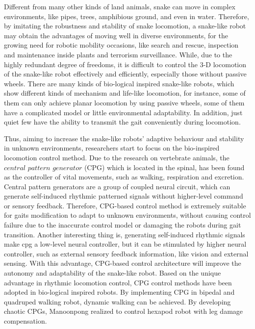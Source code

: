 \documentclass[letterpaper, 10 pt, conference]{ieeeconf}
\begin{document}
Different from many other kinds of land animals, snake can move in complex environments, like pipes, trees, amphibious ground, and even in water\cite{ma2010cpg}. Therefore, by imitating the robustness and stability of snake locomotion, a snake-like robot may obtain the advantages of moving well in diverse environments, for the growing need for robotic mobility occasions, like search and rescue, inspection and maintenance inside plants and terrorism surveillance.
While, due to the highly redundant degree of freedoms, it is difficult to control the 3-D locomotion of the snake-like robot effectively and efficiently, especially those without passive wheels\cite{tanaka2015control}.
There are many kinds of bio-logical inspired snake-like robots\cite{hirosebiologically}\cite{ACMR3}\cite{ACMR5}\cite{cmusnake2013}, which show different kinds of mechanism and life-like locomotion, for instance, some of them can only achieve planar locomotion by using passive wheels\cite{shugen2001analysis}, some of them have a complicated model\cite{saito2002modeling} or little environmental adaptability. In addition, just quiet few have the ability to transmit the gait conveniently during locomotion.

Thus, aiming to increase the snake-like robots' adaptive behaviour and stability in unknown environments, researchers start to focus on the bio-inspired locomotion control method. Due to the research on vertebrate animals, the $central$ $pattern$ $generator$ (CPG) which is located in the spinal, has been found as the controller of vital movements, such as walking, respiration and excretion\cite{cpgconcept}. Central pattern generators are a group of coupled neural circuit, which can generate self-induced rhythmic patterned signals without higher-level command or sensory feedback\cite{cpgconcept2}.
Therefore, CPG-based control method is extremely suitable for gaits modification to adapt to unknown environments, without causing control failure due to the inaccurate control model or damaging the robots during gait transition. Another interesting thing is, generating self-induced rhythmic signals make cpg a low-level neural controller, but it can be stimulated by higher neural controller, such as external sensory feedback information, like vision and external sensing. With this advantage, CPG-based control architecture will improve the autonomy and adaptability of the snake-like robot.
Based on the unique advantage in rhythmic locomotion control, CPG control methods have been adopted in bio-logical inspired robots. By implementing CPG in bipedal and quadruped walking robot, dynamic walking can be achieved\cite{cpgdynamicwalking}. By developing chaotic CPGs, Manoonpong realized to control hexapod robot with leg damage compensation\cite{cpghex}.
\end{document}
